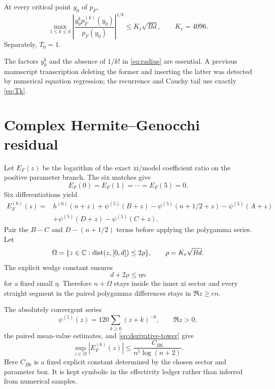 \documentclass[12pt]{article}
\begin{document}
\begin{proposition}\label{prop:radius}
At every critical point $y_0$ of $p_F$,
\begin{equation}\label{eq:radius}
 \max_{1\le k\le d}
 \left|\frac{y_0^kp_F^{(k)}(y_0)}{p_F(y_0)}\right|^{1/k}
 \le K_r\sqrt{Bd},\qquad K_r=4096.
\end{equation}
Separately, $T_0=1$.
\end{proposition}

The factors $y_0^k$ and the absence of $1/k!$ in \eqref{eq:radius} are
essential.  A previous manuscript transcription deleting the former and
inserting the latter was detected by numerical equation regression; the
recurrence and Cauchy tail use exactly \eqref{eq:Tk}.

\section{Complex Hermite--Genocchi residual}\label{sec:residual}

Let $E_F(z)$ be the logarithm of the exact xi/model coefficient ratio on the
positive parameter branch.  The six matches give
\begin{equation}\label{eq:E-nodes}
 E_F(0)=E_F(1)=\cdots=E_F(5)=0.
\end{equation}
Six differentiations yield
\begin{align}
 E_F^{(6)}(z)={}&h^{(6)}(n+z)+\psi^{(5)}(B+z)
 -\psi^{(5)}(n+1/2+z)-\psi^{(5)}(A+z)\nonumber\\
 &+\psi^{(5)}(D+z)-\psi^{(5)}(C+z).
 \label{eq:E6-exact}
\end{align}
Pair the $B-C$ and $D-(n+1/2)$ terms before applying the polygamma series.
Let
\begin{equation}\label{eq:Omega}
 \Omega=\{z\in\mathbb C:\operatorname{dist}(z,[0,d])\le2\rho\},
 \qquad \rho=K_r\sqrt{Bd}.
\end{equation}
The explicit wedge constant ensures
\begin{equation}\label{eq:domain-containment}
 d+2\rho\le\eta n
\end{equation}
for a fixed small $\eta$.  Therefore $n+\Omega$ stays inside the inner xi
sector and every straight segment in the paired polygamma differences stays
in $\Re z\ge cn$.

The absolutely convergent series
\begin{equation}\label{eq:polygamma-series}
 \psi^{(5)}(z)=120\sum_{k\ge0}(z+k)^{-6},
 \qquad \Re z>0,
\end{equation}
the paired mean-value estimates, and \eqref{eq:derivative-tower} give
\begin{equation}\label{eq:E6}
 \sup_{z\in\Omega}|E_F^{(6)}(z)|
 \le\frac{C_{B6}}{n^5\log(n+2)}.
\end{equation}
Here $C_{B6}$ is a fixed explicit constant determined by the chosen sector
and parameter box.  It is kept symbolic in the effectivity ledger rather
than inferred from numerical samples.
\end{document}

